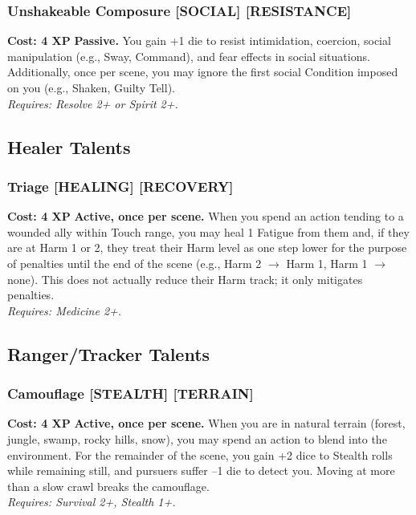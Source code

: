 \subsubsection*{Unshakeable Composure \textnormal{[SOCIAL] [RESISTANCE]}}
\label{talent:unshakeable-composure}
\textbf{Cost: 4 XP} \textbf{Passive.} You gain +1 die to resist intimidation, coercion, social manipulation (e.g., Sway, Command), and fear effects in social situations. Additionally, once per scene, you may ignore the first social Condition imposed on you (e.g., Shaken, Guilty Tell). \\
\textit{Requires: Resolve 2+ or Spirit 2+.}

\subsection*{Healer Talents}
\label{sec:major-healer}

\subsubsection*{Triage \textnormal{[HEALING] [RECOVERY]}}
\label{talent:triage}
\textbf{Cost: 4 XP} \textbf{Active, once per scene.} When you spend an action tending to a wounded ally within Touch range, you may heal 1 Fatigue from them and, if they are at Harm 1 or 2, they treat their Harm level as one step lower for the purpose of penalties until the end of the scene (e.g., Harm 2 $\rightarrow$ Harm 1, Harm 1 $\rightarrow$ none). This does not actually reduce their Harm track; it only mitigates penalties. \\
\textit{Requires: Medicine 2+.}

\subsection*{Ranger/Tracker Talents}
\label{sec:major-ranger}

\subsubsection*{Camouflage \textnormal{[STEALTH] [TERRAIN]}}
\label{talent:camouflage}
\textbf{Cost: 4 XP} \textbf{Active, once per scene.} When you are in natural terrain (forest, jungle, swamp, rocky hills, snow), you may spend an action to blend into the environment. For the remainder of the scene, you gain +2 dice to Stealth rolls while remaining still, and pursuers suffer --1 die to detect you. Moving at more than a slow crawl breaks the camouflage. \\
\textit{Requires: Survival 2+, Stealth 1+.}


